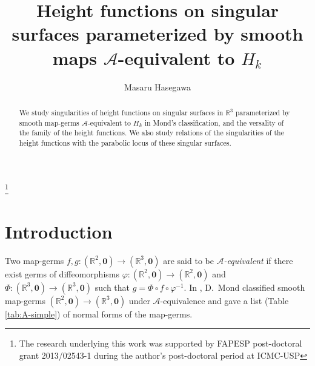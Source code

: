 \documentclass[12pt]{amsart}
\theoremstyle{plain}
\theoremstyle{definition}
\newcommand{\R}{\mathbb{R}}
\renewcommand{\phi}{\varphi}
\begin{document}
\title[Height functions on singular surfaces with $H_k$ singularities]
{Height functions on singular surfaces parameterized by
smooth maps $\mathcal{A}$-equivalent to $H_k$}

\author[M.~Hasegawa]
{Masaru Hasegawa}

\address[Masaru Hasegawa]{%
Department of Information Science, Center for Liberal Arts and Sciences, Iwate Medical University,
1-1-1 Idaidori, Yahaba-cho, Shiwa-gun, Iwate 028-3694, Japan.}
%
%

\thanks{The research underlying this work was supported by FAPESP post-doctoral grant 2013/02543-1 during the author's post-doctoral period at ICMC-USP}


\begin{abstract}
We study singularities of height functions on singular surfaces in $\mathbb{R}^3$ parameterized by smooth map-germs $\mathcal{A}$-equivalent to $H_k$ in Mond's classification, and the versality of the family of the height functions. 
We also study relations of the singularities of the height functions with the parabolic locus of these singular surfaces.
\end{abstract}


\maketitle


\section{Introduction}
\label{sec:intro}

Two map-germs $f, g\colon(\R^2,\bm{0})\to(\R^3,\bm{0})$ are said to be \textit{$\mathcal{A}$-equivalent} if there exist germs of diffeomorphisms $\phi\colon(\R^2,\bm{0})\to(\R^2,\bm{0})$ and $\Phi\colon(\R^3,\bm{0})\to(\R^3,\bm{0})$ such that $g = \Phi \circ f \circ \phi^{-1}$. 
In \cite{Mond1985}, D.~Mond classified smooth map-germs $(\R^2,\bm{0})\to(\R^3,\bm{0})$ under $\mathcal{A}$-equivalence and gave a list (Table \ref{tab:A-simple}) of normal forms of the map-germs.
\end{document}
